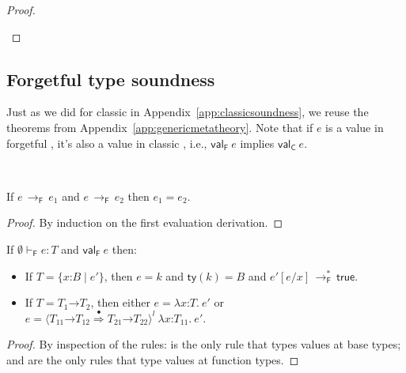 \documentclass[9pt]{extarticle}
\newcommand{\ottnt}[1]{\mathit{#1}}
\newcommand{\ottsym}[1]{#1}
\begin{document}
\begin{lemma}
\begin{proof}
{\begin{itemize}
    \end{itemize}
    \fi}
  \end{proof}
\end{lemma}

{\iffull
\subsection{Forgetful type soundness}
\label{app:forgetfulsoundness}

Just as we did for classic \lambdah in
Appendix~\ref{app:classicsoundness}, we reuse the theorems from
Appendix~\ref{app:genericmetatheory}.
Note that if $\ottnt{e}$ is a value in forgetful \lambdah, it's also a
value in classic \lambdah, i.e., $ \mathsf{val} _{  \mathsf{F}  }~ \ottnt{e} $ implies $ \mathsf{val} _{  \mathsf{C}  }~ \ottnt{e} $.

\begin{lemma}
  \label{lem:forgetfuldeterminism}
  ~

  \noindent
  If $\ottnt{e} \,  \longrightarrow _{  \mathsf{F}  }  \, \ottnt{e_{{\mathrm{1}}}}$ and $\ottnt{e} \,  \longrightarrow _{  \mathsf{F}  }  \, \ottnt{e_{{\mathrm{2}}}}$ then $\ottnt{e_{{\mathrm{1}}}}  \ottsym{=}  \ottnt{e_{{\mathrm{2}}}}$.
\begin{proof}
    By induction on the first evaluation derivation.
  \end{proof}  
\end{lemma}

\begin{lemma}
  \label{lem:forgetfulcanonicalforms}
  If $ \emptyset   \vdash _{  \mathsf{F}  }  \ottnt{e}  :  \ottnt{T} $ and $ \mathsf{val} _{  \mathsf{F}  }~ \ottnt{e} $ then:
\begin{itemize}
  \item If $\ottnt{T}  \ottsym{=}   \{ \mathit{x} \mathord{:} \ottnt{B} \mathrel{\mid} \ottnt{e'} \} $, then $\ottnt{e}  \ottsym{=}  \ottnt{k}$ and $ \mathsf{ty} ( \ottnt{k} )   \ottsym{=}  \ottnt{B}$ and
    $ \ottnt{e'}  [  \ottnt{e} / \mathit{x}  ]  \,  \longrightarrow ^{*}_{  \mathsf{F}  }  \,  \mathsf{true} $.
  \item If $\ottnt{T}  \ottsym{=}   \ottnt{T_{{\mathrm{1}}}} \mathord{ \rightarrow } \ottnt{T_{{\mathrm{2}}}} $, then either $\ottnt{e}  \ottsym{=}   \lambda \mathit{x} \mathord{:} \ottnt{T} .~  \ottnt{e'} $ or $\ottnt{e}  \ottsym{=}   \langle   \ottnt{T_{{\mathrm{11}}}} \mathord{ \rightarrow } \ottnt{T_{{\mathrm{12}}}}   \mathord{ \overset{\bullet}{\Rightarrow} }   \ottnt{T_{{\mathrm{21}}}} \mathord{ \rightarrow } \ottnt{T_{{\mathrm{22}}}}   \rangle^{ \ottnt{l} } ~   \lambda \mathit{x} \mathord{:} \ottnt{T_{{\mathrm{11}}}} .~  \ottnt{e'}  $.
  \end{itemize}
{\iffull
  \begin{proof}
    By inspection of the rules:  is the only rule that types
    values at base types;  and  are the only rules
    that type values at function types.
  \end{proof}
  \fi}
\end{lemma}

}
\end{document}
